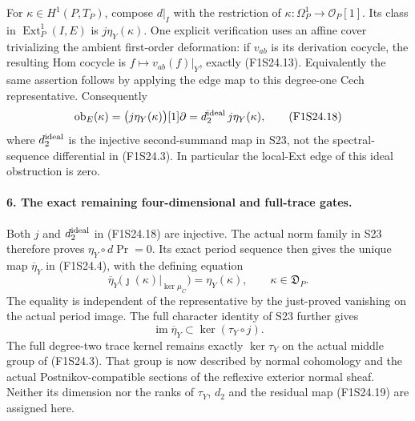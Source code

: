 For $\kappa\in H^1(P,T_P)$, compose $d|_I$ with the
restriction of $\kappa:\Omega_P^1\to\mathcal O_P[1]$.
Its class in $\operatorname{Ext}^1_P(I,E)$ is
$j\eta_Y(\kappa)$. One explicit verification uses an affine
cover trivializing the ambient first-order deformation: if
$v_{ab}$ is its derivation cocycle, the resulting Hom cocycle
is $f\mapsto v_{ab}(f)|_Y$, exactly (F1S24.13).
Equivalently the same assertion follows by applying the
edge map to this degree-one Cech representative. Consequently
\[
 \operatorname{ob}_E(\kappa)
    =\bigl(j\eta_Y(\kappa)\bigr)[1]\partial
    =d^{\rm ideal}_2\,j\eta_Y(\kappa),
 \tag{F1S24.18}
\]
where $d^{\rm ideal}_2$ is the injective second-summand map
in S23, not the spectral-sequence differential in (F1S24.3).
In particular the local-Ext edge of this ideal obstruction is zero.

\paragraph{6. The exact remaining four-dimensional and full-trace gates.}
Both $j$ and $d^{\rm ideal}_2$ in (F1S24.18) are injective.
The actual norm family in S23 therefore proves
$\eta_Y\circ d\operatorname{Pr}=0$. Its exact period sequence
then gives the unique map $\overline\eta_Y$ in (F1S24.4),
with the defining equation
\[
 \overline\eta_Y\bigl(\jmath(\kappa)|_{\ker\mu_C}\bigr)
                       =\eta_Y(\kappa),\qquad\kappa\in\mathfrak D_P.
 \tag{F1S24.19}
\]
The equality is independent of the representative by the just-proved
vanishing on the actual period image. The full character identity
of S23 further gives
\[
          \operatorname{im}\overline\eta_Y
                     \subset\ker(\tau_Y\circ j).
 \tag{F1S24.20}
\]
The full degree-two trace kernel remains exactly $\ker\tau_Y$
on the actual middle group of (F1S24.3). That group is now
described by normal cohomology and the actual Postnikov-compatible
sections of the reflexive exterior normal sheaf. Neither its
dimension nor the ranks of $\tau_Y$, $d_2$ and the residual
map (F1S24.19) are assigned here.

